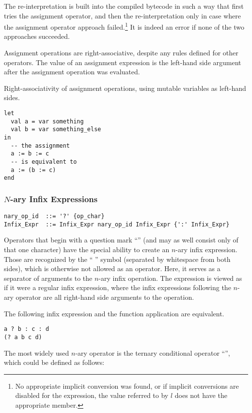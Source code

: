 The re-interpretation is built into the compiled bytecode in such a way that first tries the assignment operator, and then the re-interpretation only in case where the assignment operator approach failed.\footnote{No appropriate implicit conversion was found, or if implicit conversions are disabled for the expression, the value referred to by $l$ does not have the appropriate member.} It is indeed an error if none of the two approaches succeeded. 

Assignment operations are right-associative, despite any rules defined for other operators. The value of an assignment expression is the left-hand side argument after the assignment operation was evaluated. 

\example Right-associativity of assignment operations, using mutable variables as left-hand sides. 
\begin{lstlisting}
let
  val a = var something
  val b = var something_else
in
  -- the assignment
  a := b := c
  -- is equivalent to
  a := (b := c)
end
\end{lstlisting}




\subsubsection{$N$-ary Infix Expressions}
\label{sec:nary-infix-expressions}

\grammar\begin{lstlisting}
nary_op_id  ::= '?' {op_char}
Infix_Expr  ::= Infix_Expr nary_op_id Infix_Expr {':' Infix_Expr}
\end{lstlisting}

Operators that begin with a question mark ``'' (and may as well consist only of that one character) have the special ability to create an $n$-ary infix expression. Those are recognized by the ``\,\code{:}\,'' symbol (separated by whitespace from both sides), which is otherwise not allowed as an operator. Here, it serves as a separator of arguments to the $n$-ary infix operation. The expression is viewed as if it were a regular infix expression, where the infix expressions following the $n$-ary operator are all right-hand side arguments to the operation. 

The following infix expression and the function application are equivalent.
\begin{lstlisting}
a ? b : c : d
(? a b c d)
\end{lstlisting}

\example The most widely used $n$-ary operator is the ternary conditional operator ``'', which could be defined as follows:

